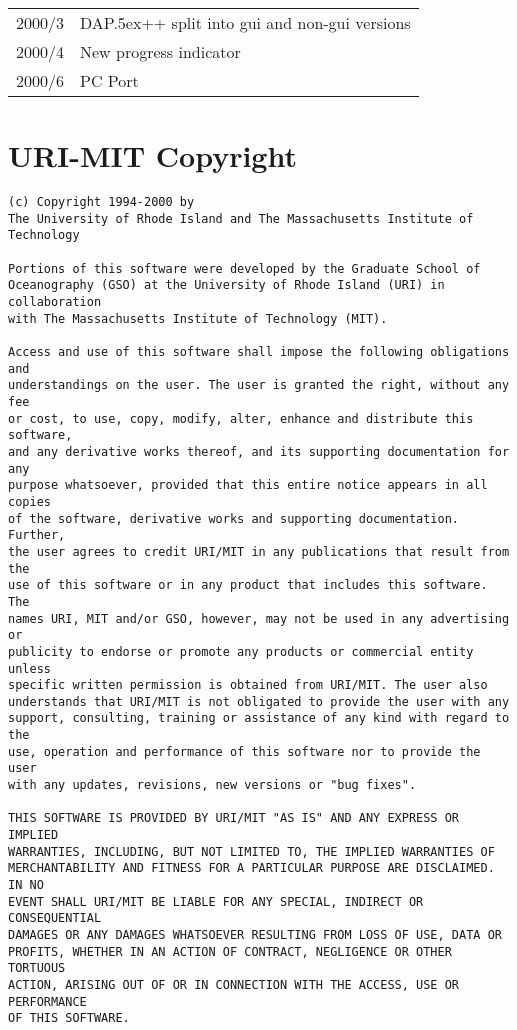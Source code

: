 \documentclass{article}
\newcommand{\dap}{\rm {\small DAP}\raise.5ex\hbox{\footnotesize ++}\xspace}
\begin{document}
\begin{table}[h]
\begin{minipage}{\linewidth}
\begin{center}
\begin{tabular} {|rl|}
2000/3 &  \dap split into gui and non-gui versions \\
2000/4 &  New progress indicator \\
2000/6 &  PC Port \\ \hline
\end{tabular}
\end{center}
\end{minipage}
\end{table}

\clearpage
\appendix

\section{URI-MIT Copyright}
\label{URI-copyright}
\begin{verbatim}
(c) Copyright 1994-2000 by
The University of Rhode Island and The Massachusetts Institute of Technology

Portions of this software were developed by the Graduate School of
Oceanography (GSO) at the University of Rhode Island (URI) in collaboration
with The Massachusetts Institute of Technology (MIT).
 
Access and use of this software shall impose the following obligations and
understandings on the user. The user is granted the right, without any fee
or cost, to use, copy, modify, alter, enhance and distribute this software,
and any derivative works thereof, and its supporting documentation for any
purpose whatsoever, provided that this entire notice appears in all copies
of the software, derivative works and supporting documentation.  Further,
the user agrees to credit URI/MIT in any publications that result from the
use of this software or in any product that includes this software. The
names URI, MIT and/or GSO, however, may not be used in any advertising or
publicity to endorse or promote any products or commercial entity unless
specific written permission is obtained from URI/MIT. The user also
understands that URI/MIT is not obligated to provide the user with any
support, consulting, training or assistance of any kind with regard to the
use, operation and performance of this software nor to provide the user
with any updates, revisions, new versions or "bug fixes".

THIS SOFTWARE IS PROVIDED BY URI/MIT "AS IS" AND ANY EXPRESS OR IMPLIED
WARRANTIES, INCLUDING, BUT NOT LIMITED TO, THE IMPLIED WARRANTIES OF
MERCHANTABILITY AND FITNESS FOR A PARTICULAR PURPOSE ARE DISCLAIMED. IN NO
EVENT SHALL URI/MIT BE LIABLE FOR ANY SPECIAL, INDIRECT OR CONSEQUENTIAL
DAMAGES OR ANY DAMAGES WHATSOEVER RESULTING FROM LOSS OF USE, DATA OR
PROFITS, WHETHER IN AN ACTION OF CONTRACT, NEGLIGENCE OR OTHER TORTUOUS
ACTION, ARISING OUT OF OR IN CONNECTION WITH THE ACCESS, USE OR PERFORMANCE
OF THIS SOFTWARE.
\end{verbatim}
\end{document}
